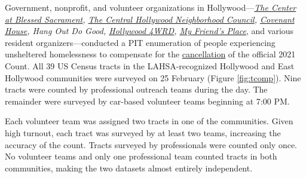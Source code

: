 \documentclass[11pt]{article}
\def\resp{respectively}
\begin{document}

\pagebreak

 Government, nonprofit, and volunteer organizations in Hollywood---{\it \href{https://thecenterinhollywood.org}
{The Center at Blessed Sacrament}, \href{https://chnc.org}{The Central Hollywood Neighborhood Council}, 
\href{https://www.covenanthouse.org/spring-meal-match?sourceid=2483460&origin=DHQEI2109EZI0N&utm_source=2103marchmealmatchweb&utm_medium=cpc&utm_campaign=FY21MarchMealMatch&utm_content=bsd2103marchmealmatchweb&gclid=CjwKCAiAp4KCBhB6EiwAxRxbpJA2yM7lM2tyAqjVALZgBGvjnhobCJJ0XmuELFDXzM5xxZ0BqyX1ChoCLi0QAvD_BwE}{Covenant House}, 
Hang Out Do Good, \href{https://hollywood4wrd.live}{Hollywood 4WRD}, 
 \href{https://www.myfriendsplace.org/}{My Friend's Place}}, and various resident organizers---conducted 
a PIT enumeration of people experiencing unsheltered homelessness to compensate for 
the \href{https://laist.com/latest/post/20201209/LAHSA-cancels-2021-homeless-count-los-angeles-covid-19}
{cancellation} of the official 2021 Count. All 39 US Census tracts in the LAHSA-recognized Hollywood 
and East Hollywood communities were surveyed on 25 February (Figure \ref{fig:tcomp}). Nine tracts 
were counted by professional outreach teams during the %
day. The remainder were surveyed by car-based volunteer teams beginning at 7:00 PM.

Each volunteer team was assigned two tracts in one of the communities. Given high turnout, each tract was 
surveyed by at least two teams, increasing the accuracy of the count. Tracts 
surveyed by professionals were counted only once. No volunteer teams and only one professional team counted 
tracts in both communities, making the two datasets almost entirely independent.
\end{document}
